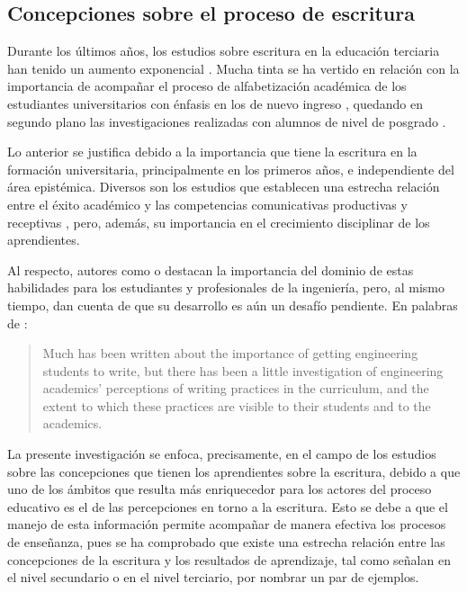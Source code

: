 \documentclass[spanish]{textolivre}
\begin{document}
\subsection{Concepciones sobre el proceso de escritura}

Durante los últimos años, los estudios sobre escritura en la educación terciaria han tenido un aumento exponencial \cite{navarro2016panorama}. Mucha tinta se ha vertido en relación con la importancia de acompañar el proceso de alfabetización académica de los estudiantes universitarios con énfasis en los de nuevo ingreso \cite{roald2021learning}, quedando en segundo plano las investigaciones realizadas con alumnos de nivel de posgrado \cite{calle2022obstacles}.

Lo anterior se justifica debido a la importancia que tiene la escritura en la formación universitaria, principalmente en los primeros años, e independiente del área epistémica. Diversos son los estudios que establecen una estrecha relación entre el éxito académico y las competencias comunicativas productivas \cite{ulu2019investigation, turkben2021relationship} y receptivas \cite{kilner2019using, liu2020general}, pero, además, su importancia en el crecimiento disciplinar de los aprendientes.

Al respecto, autores como \textcite{walton2020writing} o \textcite{selwyn2020developing} destacan la importancia del dominio de estas habilidades para los estudiantes y profesionales de la ingeniería, pero, al mismo tiempo, dan cuenta de que su desarrollo es aún un desafío pendiente. En palabras de \textcite[p. 71]{goldsmith2019investigating}:

\begin{quote}
Much has been written about the importance of getting engineering students to write, but there has been a little investigation of engineering academics’ perceptions of writing practices in the curriculum, and the extent to which these practices are visible to their students and to the academics. 
\end{quote}

La presente investigación se enfoca, precisamente, en el campo de los estudios sobre las concepciones que tienen los aprendientes sobre la escritura, debido a que uno de los ámbitos que resulta más enriquecedor para los actores del proceso educativo es el de las percepciones en torno a la escritura. Esto se debe a que el manejo de esta información permite acompañar de manera efectiva los procesos de enseñanza, pues se ha comprobado que existe una estrecha relación entre las concepciones de la escritura y los resultados de aprendizaje, tal como señalan \textcite{miras2013creencias} en el nivel secundario o \textcite{gonzalez2020concepciones} en el nivel terciario, por nombrar un par de ejemplos.
\end{document}
